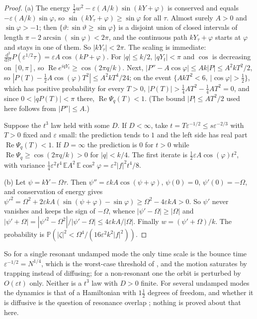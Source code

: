 \documentclass[11pt]{article}
\newcommand{\dd}{\mathrm{d}}
\newcommand{\E}{\mathbb{E}}
\newcommand{\PP}{\mathbb{P}}
\newcommand{\eps}{\varepsilon}
\renewcommand{\Re}{\operatorname{Re}}
\theoremstyle{remark}
\begin{document}
\begin{proof}
(a) The energy $\frac12w^2-\eps(A/k)\sin(kY+\varphi)$ is conserved and equals
$-\eps(A/k)\sin\varphi$, so $\sin(kY_\tau+\varphi)\ge\sin\varphi$ for all
$\tau$. Almost surely $A>0$ and $\sin\varphi>-1$; then
$\{\vartheta:\sin\vartheta\ge\sin\varphi\}$ is a disjoint union of closed
intervals of length $\pi-2\arcsin(\sin\varphi)<2\pi$, and the continuous
path $kY_\tau+\varphi$ starts at $\varphi$ and stays in one of them. So
$|kY_\tau|<2\pi$. The scaling is immediate:
$\frac{\dd^2}{\dd\tau^2}P(\eps^{1/2}\tau) = \eps A\cos(kP+\varphi)$. For
$|q|\le k/2$, $|qY_t|<\pi$ and $\cos$ is decreasing on $[0,\pi]$, so
$\Re e^{iqY_t}\ge\cos(2\pi q/k)$. Next,
$|P''-A\cos\varphi|\le Ak|P|\le A^2kT^2/2$, so
$|P(T)-\frac12A\cos(\varphi)T^2|\le A^2kT^4/24$; on the event
$\{AkT^2<6,\ |\cos\varphi|>\frac12\}$, which has positive probability for
every $T>0$, $|P(T)|>\frac14AT^2-\frac14AT^2 = 0$, and since $0<|qP(T)|<\pi$
there, $\Re\Psi_q(T)<1$. (The bound $|P|\le AT^2/2$ used here follows from
$|P''|\le A$.)

Suppose the $t^3$ law held with some $D$. If $D<\infty$, take
$t = T\eps^{-1/2}\le s\eps^{-2/3}$ with $T>0$ fixed and $\eps$ small: the prediction
tends to $1$ and the left side has real part $\Re\Psi_q(T)<1$. If
$D=\infty$ the prediction is $0$ for $t>0$ while
$\Re\Psi_q\ge\cos(2\pi q/k)>0$ for $|q|<k/4$. The first iterate is
$\frac12\eps A\cos(\varphi)t^2$, with variance
$\frac14\eps^2t^4\,\E A^2\,\E\cos^2\varphi = \eps^2|f|^2t^4/8$.

(b) Let $\psi = kY-\Omega\tau$. Then $\psi'' = \eps kA\cos(\psi+\varphi)$,
$\psi(0)=0$, $\psi'(0) = -\Omega$, and conservation of energy gives
$\psi'^2 = \Omega^2+2\eps kA(\sin(\psi+\varphi)-\sin\varphi)\ge\Omega^2-4\eps kA>0$.
So $\psi'$ never vanishes and keeps the sign of $-\Omega$, whence
$|\psi'-\Omega|\ge|\Omega|$ and
$|\psi'+\Omega| = |\psi'^2-\Omega^2|/|\psi'-\Omega|\le4\eps kA/|\Omega|$.
Finally $w = (\psi'+\Omega)/k$. The probability is
$\PP(|\zeta|^2<\Omega^4/(16\eps^2k^2|f|^2))$.
\end{proof}

So for a single resonant undamped mode the only time scale is the bounce
time $\eps^{-1/2} = N^{1/4}$, which is the worst-case threshold of
\cite[Proposition~7]{Note}, and the motion saturates by trapping instead of
diffusing; for a non-resonant one the orbit is perturbed by $O(\eps t)$
only. Neither is a $t^3$ law with $D>0$ finite. For several undamped modes
the dynamics is that of a Hamiltonian with $1\frac12$ degrees of freedom,
and whether it is diffusive is the question of resonance overlap
\cite{Chirikov}; nothing is proved about that here.
\end{document}
